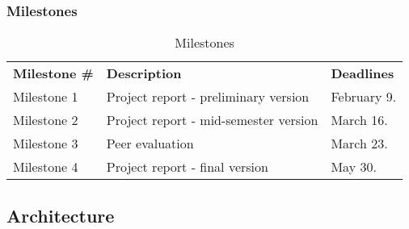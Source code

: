 \subsubsection{Milestones}
\begin{table}[H]
\centering
{}
\begin{tabular}{|l|l|l|}
\hline
\textbf{Milestone \#} & \textbf{Description} & \textbf{Deadlines}\\
Milestone 1& Project report - preliminary version & February 9. \\
Milestone 2 & Project report - mid-semester version & March 16.  \\
Milestone 3 & Peer evaluation & March 23.  \\
 Milestone 4 & Project report - final version & May 30.\\\hline
\end{tabular}
\caption{Milestones}
\end{table}

\subsection{Architecture}